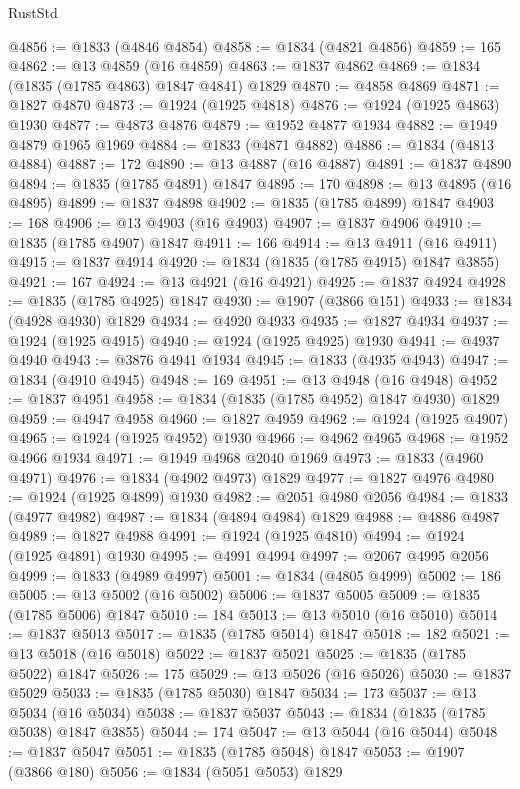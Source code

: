 \begin{lexlean}{RustStd}
\begin{coremodule}
@4856 := @1833 (@4846 @4854)
@4858 := @1834 (@4821 @4856)
@4859 := 165
@4862 := @13 @4859 (@16 @4859)
@4863 := @1837 @4862
@4869 := @1834 (@1835 (@1785 @4863) @1847 @4841) @1829
@4870 := @4858 @4869
@4871 := @1827 @4870
@4873 := @1924 (@1925 @4818)
@4876 := @1924 (@1925 @4863) @1930
@4877 := @4873 @4876
@4879 := @1952 @4877 @1934
@4882 := @1949 @4879 @1965 @1969
@4884 := @1833 (@4871 @4882)
@4886 := @1834 (@4813 @4884)
@4887 := 172
@4890 := @13 @4887 (@16 @4887)
@4891 := @1837 @4890
@4894 := @1835 (@1785 @4891) @1847
@4895 := 170
@4898 := @13 @4895 (@16 @4895)
@4899 := @1837 @4898
@4902 := @1835 (@1785 @4899) @1847
@4903 := 168
@4906 := @13 @4903 (@16 @4903)
@4907 := @1837 @4906
@4910 := @1835 (@1785 @4907) @1847
@4911 := 166
@4914 := @13 @4911 (@16 @4911)
@4915 := @1837 @4914
@4920 := @1834 (@1835 (@1785 @4915) @1847 @3855)
@4921 := 167
@4924 := @13 @4921 (@16 @4921)
@4925 := @1837 @4924
@4928 := @1835 (@1785 @4925) @1847
@4930 := @1907 (@3866 @151)
@4933 := @1834 (@4928 @4930) @1829
@4934 := @4920 @4933
@4935 := @1827 @4934
@4937 := @1924 (@1925 @4915)
@4940 := @1924 (@1925 @4925) @1930
@4941 := @4937 @4940
@4943 := @3876 @4941 @1934
@4945 := @1833 (@4935 @4943)
@4947 := @1834 (@4910 @4945)
@4948 := 169
@4951 := @13 @4948 (@16 @4948)
@4952 := @1837 @4951
@4958 := @1834 (@1835 (@1785 @4952) @1847 @4930) @1829
@4959 := @4947 @4958
@4960 := @1827 @4959
@4962 := @1924 (@1925 @4907)
@4965 := @1924 (@1925 @4952) @1930
@4966 := @4962 @4965
@4968 := @1952 @4966 @1934
@4971 := @1949 @4968 @2040 @1969
@4973 := @1833 (@4960 @4971)
@4976 := @1834 (@4902 @4973) @1829
@4977 := @1827 @4976
@4980 := @1924 (@1925 @4899) @1930
@4982 := @2051 @4980 @2056
@4984 := @1833 (@4977 @4982)
@4987 := @1834 (@4894 @4984) @1829
@4988 := @4886 @4987
@4989 := @1827 @4988
@4991 := @1924 (@1925 @4810)
@4994 := @1924 (@1925 @4891) @1930
@4995 := @4991 @4994
@4997 := @2067 @4995 @2056
@4999 := @1833 (@4989 @4997)
@5001 := @1834 (@4805 @4999)
@5002 := 186
@5005 := @13 @5002 (@16 @5002)
@5006 := @1837 @5005
@5009 := @1835 (@1785 @5006) @1847
@5010 := 184
@5013 := @13 @5010 (@16 @5010)
@5014 := @1837 @5013
@5017 := @1835 (@1785 @5014) @1847
@5018 := 182
@5021 := @13 @5018 (@16 @5018)
@5022 := @1837 @5021
@5025 := @1835 (@1785 @5022) @1847
@5026 := 175
@5029 := @13 @5026 (@16 @5026)
@5030 := @1837 @5029
@5033 := @1835 (@1785 @5030) @1847
@5034 := 173
@5037 := @13 @5034 (@16 @5034)
@5038 := @1837 @5037
@5043 := @1834 (@1835 (@1785 @5038) @1847 @3855)
@5044 := 174
@5047 := @13 @5044 (@16 @5044)
@5048 := @1837 @5047
@5051 := @1835 (@1785 @5048) @1847
@5053 := @1907 (@3866 @180)
@5056 := @1834 (@5051 @5053) @1829

\end{coremodule}
\end{lexlean}
